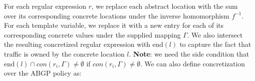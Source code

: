 \documentclass[twocolumn, openany]{sig-alternate-10pt}
\begin{document}

For each regular expression $r$, we replace each abstract location with the sum over its corresponding concrete locations under the inverse homomorphism $f^{-1}$. For each template variable, we replace it with a new entry for each of its corresponding concrete values under the supplied mapping $\Gamma$. We also intersect the resulting concretized regular expression with $\text{end}(l)$ to capture the fact that traffic is owned by the concrete location $l$. \textbf{Note}: we need the side condition that $\text{end}(l) \cap con(r_i,\Gamma) \neq \emptyset$ if $con(r_i,\Gamma) \neq \emptyset$.
We can also define concretization over the ABGP policy as:
\end{document}
